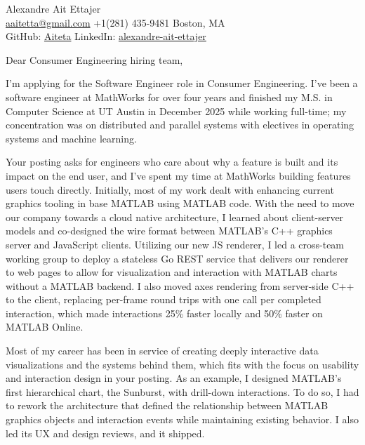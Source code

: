 \documentclass{article}
\begin{document}
\begin{flushleft}
    {\Large Alexandre Ait Ettajer} \\
    \href{mailto:aaitetta@gmail.com}{aaitetta@gmail.com} \quad +1(281) 435-9481 \quad Boston, MA \\
    GitHub: \href{https://github.com/aiteta}{Aiteta} \quad LinkedIn: \href{https://www.linkedin.com/in/alexandre-ait-ettajer-65740b170/}{alexandre-ait-ettajer} \\
\end{flushleft}

\vspace{1em}

Dear Consumer Engineering hiring team,

I'm applying for the Software Engineer role in Consumer Engineering. I've been a software engineer at MathWorks for over four years and finished my M.S. in Computer Science at UT Austin in December 2025 while working full-time; my concentration was on distributed and parallel systems with electives in operating systems and machine learning.

Your posting asks for engineers who care about why a feature is built and its impact on the end user, and I've spent my time at MathWorks building features users touch directly.
Initially, most of my work dealt with enhancing current graphics tooling in base MATLAB using MATLAB code.
With the need to move our company towards a cloud native architecture, I learned about client-server models and co-designed the wire format between MATLAB's C++ graphics server and JavaScript clients.
Utilizing our new JS renderer, I led a cross-team working group to deploy a stateless Go REST service that delivers our renderer to web pages to allow for visualization and interaction with MATLAB charts without a MATLAB backend.
I also moved axes rendering from server-side C++ to the client, replacing per-frame round trips with one call per completed interaction, which made interactions 25\% faster locally and 50\% faster on MATLAB Online.

Most of my career has been in service of creating deeply interactive data visualizations and the systems behind them, which fits with the focus on usability and interaction design in your posting.
As an example, I designed MATLAB's first hierarchical chart, the Sunburst, with drill-down interactions.
To do so, I had to rework the architecture that defined the relationship between MATLAB graphics objects and interaction events while maintaining existing behavior.
I also led its UX and design reviews, and it shipped.
\end{document}
